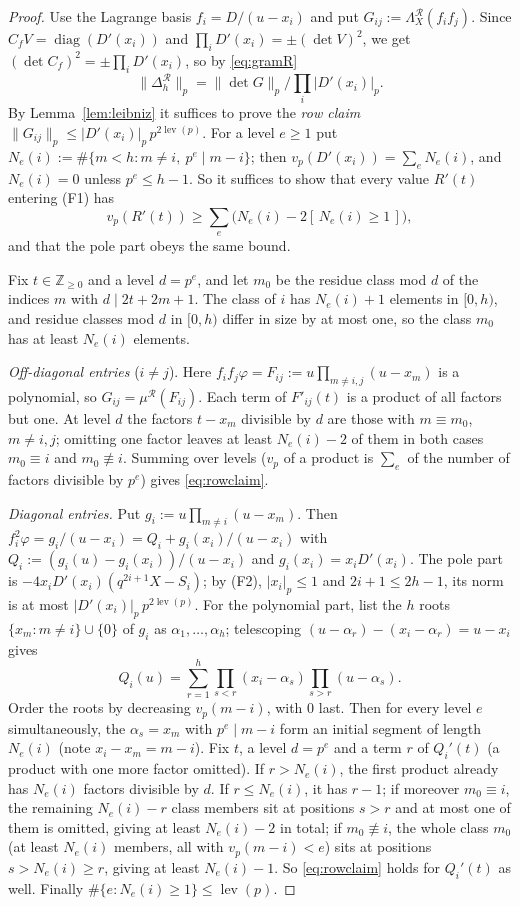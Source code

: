 \documentclass[11pt]{amsart}
\theoremstyle{definition}
\theoremstyle{remark}
\numberwithin{equation}{section}
\newcommand{\ZZ}{\mathbb{Z}}
\newcommand{\cR}{\mathcal{R}}
\newcommand{\ind}[1]{[\,#1\,]}
\newcommand{\lev}{\operatorname{lev}}
\begin{document}
\begin{proof}
Use the Lagrange basis $f_i=D/(u-x_i)$ and put $G_{ij}:=\Lambda^{\cR}_X(f_if_j)$. Since $C_fV=\operatorname{diag}(D'(x_i))$
and $\prod_iD'(x_i)=\pm(\det V)^2$, we get $(\det C_f)^2=\pm\prod_iD'(x_i)$, so by \eqref{eq:gramR}
\[
  \|\Delta^{\cR}_h\|_p=\|\det G\|_p\Big/\prod_i|D'(x_i)|_p .
\]
By Lemma~\ref{lem:leibniz} it suffices to prove the \emph{row claim} $\|G_{ij}\|_p\le|D'(x_i)|_p\,p^{2\lev(p)}$. For a
level $e\ge1$ put $N_e(i):=\#\{m<h:m\ne i,\ p^e\mid m-i\}$; then $v_p(D'(x_i))=\sum_eN_e(i)$, and $N_e(i)=0$ unless
$p^e\le h-1$. So it suffices to show that every value $R'(t)$ entering (F1) has
\begin{equation}\label{eq:rowclaim}
  v_p(R'(t))\ge\sum_e\bigl(N_e(i)-2\ind{N_e(i)\ge1}\bigr),
\end{equation}
and that the pole part obeys the same bound.

Fix $t\in\ZZ_{\ge0}$ and a level $d=p^e$, and let $m_0$ be the residue class mod $d$ of the indices $m$ with
$d\mid2t+2m+1$. The class of $i$ has $N_e(i)+1$ elements in $[0,h)$, and residue classes mod $d$ in $[0,h)$ differ in
size by at most one, so the class $m_0$ has at least $N_e(i)$ elements.

\emph{Off-diagonal entries} ($i\ne j$). Here $f_if_j\varphi=F_{ij}:=u\prod_{m\ne i,j}(u-x_m)$ is a polynomial, so
$G_{ij}=\mu^{\cR}(F_{ij})$. Each term of $F'_{ij}(t)$ is a product of all factors but one. At level $d$ the factors
$t-x_m$ divisible by $d$ are those with $m\equiv m_0$, $m\ne i,j$; omitting one factor leaves at least
$N_e(i)-2$ of them in both cases $m_0\equiv i$ and $m_0\not\equiv i$. Summing over levels ($v_p$ of a product is
$\sum_e$ of the number of factors divisible by $p^e$) gives \eqref{eq:rowclaim}.

\emph{Diagonal entries.} Put $g_i:=u\prod_{m\ne i}(u-x_m)$. Then $f_i^2\varphi=g_i/(u-x_i)=Q_i+g_i(x_i)/(u-x_i)$ with
$Q_i:=(g_i(u)-g_i(x_i))/(u-x_i)$ and $g_i(x_i)=x_iD'(x_i)$. The pole part is $-4x_iD'(x_i)(q^{2i+1}X-S_i)$; by (F2),
$|x_i|_p\le1$ and $2i+1\le2h-1$, its norm is at most $|D'(x_i)|_p\,p^{2\lev(p)}$. For the polynomial part, list the
$h$ roots $\{x_m:m\ne i\}\cup\{0\}$ of $g_i$ as $\alpha_1,\dots,\alpha_h$; telescoping
$(u-\alpha_r)-(x_i-\alpha_r)=u-x_i$ gives
\[
  Q_i(u)=\sum_{r=1}^{h}\prod_{s<r}(x_i-\alpha_s)\prod_{s>r}(u-\alpha_s).
\]
Order the roots by decreasing $v_p(m-i)$, with $0$ last. Then for every level $e$ simultaneously, the $\alpha_s=x_m$ with
$p^e\mid m-i$ form an initial segment of length $N_e(i)$ (note $x_i-x_m=m-i$). Fix $t$, a level $d=p^e$ and a term
$r$ of $Q_i'(t)$ (a product with one more factor omitted). If $r>N_e(i)$, the first product already has $N_e(i)$
factors divisible by $d$. If $r\le N_e(i)$, it has $r-1$; if moreover $m_0\equiv i$, the remaining $N_e(i)-r$ class
members sit at positions $s>r$ and at most one of them is omitted, giving at least $N_e(i)-2$ in total; if
$m_0\not\equiv i$, the whole class $m_0$ (at least $N_e(i)$ members, all with $v_p(m-i)<e$) sits at positions
$s>N_e(i)\ge r$, giving at least $N_e(i)-1$. So \eqref{eq:rowclaim} holds for $Q_i'(t)$ as well. Finally
$\#\{e:N_e(i)\ge1\}\le\lev(p)$.
\end{proof}
\end{document}
